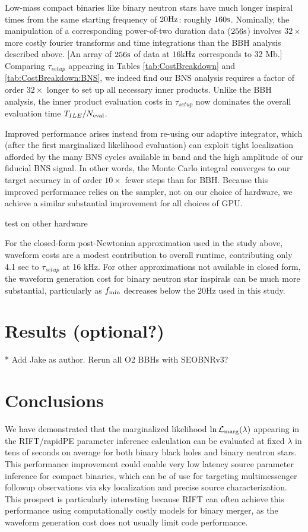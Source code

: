 \documentclass[twocolumn,prd,nofootinbib]{revtex4}
\newcommand\unit[1]{{\rm #1}}
\newcommand\editremark[1]{{\color{red} #1}}
\begin{document}
Low-mass compact binaries like binary neutron stars have much longer inspiral times from the same starting frequency of
$20\unit{Hz}$: roughly $160 \unit{s}$.   Nominally, the manipulation of a corresponding power-of-two duration data ($256\unit{s}$) involves
$32\times$ more costly fourier transforms and time integrations than the BBH analysis described above.  
[An array of $256\unit{s}$ of data at $16\unit{kHz}$ corresponds to  32 Mb.]  Comparing $\tau_{setup}$ appearing in Tables
 \ref{tab:CostBreakdown} and  \ref{tab:CostBreakdown:BNS}, we indeed find our BNS analysis requires  a factor of order   $32\times$
 longer to set up all necessary inner products.  Unlike the BBH analysis, the inner product evaluation costs in
 $\tau_{setup}$ now dominates the
 overall evaluation time $T_{ILE}/N_{\rm eval}$. 


Improved performance arises instead from re-using our adaptive integrator, which (after the first marginalized
likelihood evaluation) can exploit tight localization afforded by the many BNS cycles available in band and the high
amplitude of our fiducial BNS signal.  In other
words, the Monte Carlo integral converges to our target accuracy in of order $10\times $ fewer steps than for BBH.  
Because this improved performance relies on the sampler, not on our choice of hardware, we achieve a similar substantial
improvement for all choices of GPU.


\editremark{test on other hardware}


For the closed-form post-Newtonian approximation used in the study above, waveform costs are a modest contribution to
overall runtime, contributing only 4.1 sec to $\tau_{setup}$ at 16 kHz.
For other approximations not available in closed form, the waveform generation cost for binary neutron star inspirals
can be much more substantial, particularly as $f_{\rm min}$ decreases below the 20\unit{Hz} used in this study.  

\section{ Results (optional?)}

* Add Jake as author.  Rerun all O2 BBHs with SEOBNRv3?

\section{Conclusions}
We have demonstrated that the marginalized likelihood $\ln {\cal L}_{\rm marg}(\lambda)$ appearing in the RIFT/rapidPE parameter
inference calculation can be evaluated at fixed $\lambda$ in tens of seconds on average for
both binary black holes and binary neutron stars.  This performance improvement could enable very low latency source
parameter inference for compact binaries, which can be of use for targeting multimessenger followup observations via sky
localization and  precise source characterization.     This prospect is particularly interesting because RIFT can
often achieve this performance using computationally costly models for binary merger, as the waveform generation cost
does not usually limit code performance.   
\end{document}
